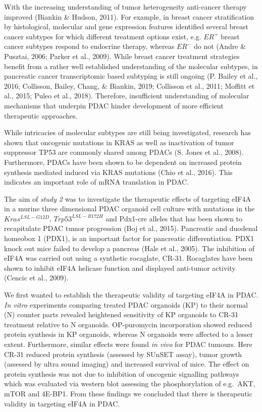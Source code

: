 \documentclass[12pt,openany]{book}
\begin{document}
With the increasing understanding of tumor heterogeneity anti-cancer
therapy improved (Biankin \& Hudson, 2011). For example, in breast
cancer stratification by histological, molecular and gene expression
features identified several breast cancer subtypes for which different
treatment options exist, e.g. \(ER^+\) breast cancer subtypes respond to
endocrine therapy, whereas \(ER^-\) do not (Andre \& Pusztai, 2006;
Parker et al., 2009). While breast cancer treatment strategies benefit
from a rather well established understanding of the molecular subtypes,
in pancreatic cancer transcriptomic based subtyping is still ongoing (P.
Bailey et al., 2016; Collisson, Bailey, Chang, \& Biankin, 2019;
Collisson et al., 2011; Moffitt et al., 2015; Puleo et al., 2018).
Therefore, insufficient understanding of molecular mechanisms that
underpin PDAC hinder development of more efficient therapeutic
approaches.

While intricacies of molecular subtypes are still being investigated,
research has shown that oncogenic mutations in KRAS as well as
inactivation of tumor suppressor TP53 are commonly shared among PDACs
(S. Jones et al., 2008). Furthermore, PDACs have been shown to be
dependent on increased protein synthesis mediated induced via KRAS
mutations (Chio et al., 2016). This indicates an important role of mRNA
translation in PDAC.

The aim of \emph{study 2} was to investigate the therapeutic effects of
targeting eIF4A in a murine three dimensional PDAC organoid cell culture
with mutations in the \(Kras^{LSL-G12D}\), \(Trp53^{LSL-R172H}\) and
Pdx1-cre alleles that has been shown to recapitulate PDAC tumor
progression (Boj et al., 2015). Pancreatic and duodenal homeobox 1
(PDX1), is an important factor for pancreatic differentiation. PDX1
knock out mice failed to develop a pancreas (Hale et al., 2005). The
inhibition of eIF4A was carried out using a synthetic rocaglate, CR-31.
Rocaglates have been shown to inhibit eIF4A helicase function and
displayed anti-tumor activity (Cencic et al., 2009).

We first wanted to establish the therapeutic validity of targeting eIF4A
in PDAC. \emph{In vitro} experiments comparing treated PDAC organoids
(KP) to their normal (N) counter parts revealed heightened sensitivity
of KP organoids to CR-31 treatment relative to N organoids. OP-puromycin
incorporation showed reduced protein synthesis in KP organoids, whereas
N organoids were affected to a lesser extent. Furthermore, similar
effects were found \emph{in vivo} for PDAC tumours. Here CR-31 reduced
protein synthesis (assessed by SUnSET assay), tumor growth (assessed by
ultra sound imaging) and increased survival of mice. The effect on
protein synthesis was not due to inhibition of oncogenic signalling
pathways which was evaluated via western blot assessing the
phosphorylation of e.g.~AKT, mTOR and 4E-BP1. From these findings we
concluded that there is therapeutic validity in targeting eIF4A in PDAC.
\end{document}
